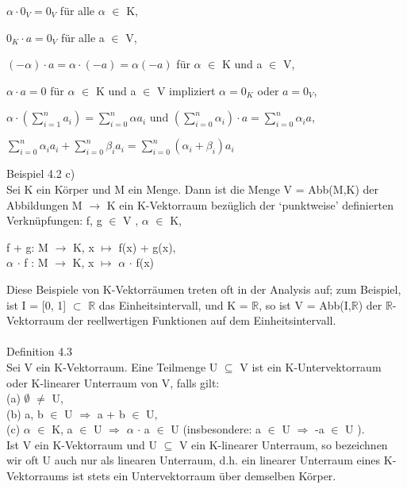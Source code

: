 \documentclass[fontsize=10pt]{scrartcl}
\begin{document}
\begin{compactitem}
\item $\alpha \cdot 0_V = 0_V$ für alle $\alpha$ $\in$ K,
\item $0_K \cdot a = 0_V$  für alle a $\in$ V,
\item $(-\alpha) \cdot a = \alpha \cdot (-a) = \alpha(-a)$ für $\alpha$ $\in$ K und a $\in$ V,
\item $\alpha \cdot a = 0$ für $\alpha$ $\in$ K und a $\in$ V impliziert $\alpha = 0_K$ oder $a = 0_V$,
\item $\alpha \cdot (\sum\nolimits_{i=1}^{n} a_i) = \sum\nolimits_{i=0}^{n} \alpha a_i$ und $(\sum\nolimits_{i=0}^{n}\alpha_i) \cdot a = \sum\nolimits_{i=0}^{n} \alpha_i a$,
\item $\sum\nolimits_{i=0}^{n} \alpha_i a_i + \sum\nolimits_{i=0}^{n} \beta_i a_i = \sum\nolimits_{i=0}^{n} (\alpha_i + \beta_i) a_i$\\
\end{compactitem}
Beispiel 4.2 c)\\
Sei K ein Körper und M ein Menge. Dann ist die Menge V = Abb(M,K) der Abbildungen M $\to$ K ein K-Vektorraum bezüglich der ‘punktweise’ definierten Verknüpfungen: f, g $\in$ V , $\alpha$ $\in$ K,
\begin{center}
f + g: M $\to$ K, x $\mapsto$ f(x) + g(x),\\
$\alpha$ $\cdot$ f : M $\to$ K, x $\mapsto$ $\alpha$ $\cdot$ f(x)
\end{center}
Diese Beispiele von K-Vektorräumen treten oft in der Analysis auf; zum Beispiel, ist I = [0, 1] $\subset$ $\mathbb{R}$ das Einheitsintervall, und K = $\mathbb{R}$, so ist V = Abb(I,$\mathbb{R}$) der $\mathbb{R}$-Vektorraum der reellwertigen Funktionen auf dem Einheitsintervall. \\
\\
Definition 4.3\\
Sei V ein K-Vektorraum. Eine Teilmenge U $\subseteq$ V ist ein K-Untervektorraum oder K-linearer Unterraum von V, falls gilt: \\
(a) $\emptyset$ $\neq$ U, \\
(b) a, b $\in$ U $\Rightarrow$ a + b $\in$ U,\\ 
(c) $\alpha$ $\in$ K, a $\in$ U $\Rightarrow$ $\alpha$ $\cdot$ a $\in$ U (insbesondere: a $\in$ U $\Rightarrow$ -a $\in$ U ).\\ 
Ist V ein K-Vektorraum und U $\subseteq$ V ein K-linearer Unterraum, so bezeichnen wir oft U auch nur als linearen Unterraum, d.h. ein linearer Unterraum eines K-Vektorraums ist stets ein Untervektorraum über demselben Körper. \\
\end{document}
